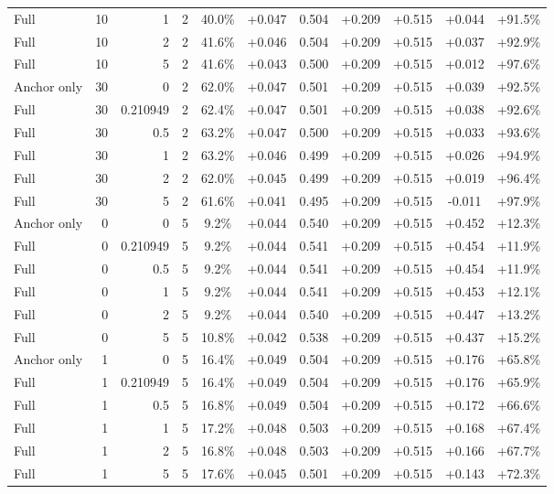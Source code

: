 \begin{table}[htbp]
\begin{tabular}{lrrrccccccc}
Full & 10 & 1 & 2 & 40.0\% & +0.047 & 0.504 & +0.209 & +0.515 & +0.044 & +91.5\% \\
Full & 10 & 2 & 2 & 41.6\% & +0.046 & 0.504 & +0.209 & +0.515 & +0.037 & +92.9\% \\
Full & 10 & 5 & 2 & 41.6\% & +0.043 & 0.500 & +0.209 & +0.515 & +0.012 & +97.6\% \\
Anchor only & 30 & 0 & 2 & 62.0\% & +0.047 & 0.501 & +0.209 & +0.515 & +0.039 & +92.5\% \\
Full & 30 & 0.210949 & 2 & 62.4\% & +0.047 & 0.501 & +0.209 & +0.515 & +0.038 & +92.6\% \\
Full & 30 & 0.5 & 2 & 63.2\% & +0.047 & 0.500 & +0.209 & +0.515 & +0.033 & +93.6\% \\
Full & 30 & 1 & 2 & 63.2\% & +0.046 & 0.499 & +0.209 & +0.515 & +0.026 & +94.9\% \\
Full & 30 & 2 & 2 & 62.0\% & +0.045 & 0.499 & +0.209 & +0.515 & +0.019 & +96.4\% \\
Full & 30 & 5 & 2 & 61.6\% & +0.041 & 0.495 & +0.209 & +0.515 & -0.011 & +97.9\% \\
Anchor only & 0 & 0 & 5 & 9.2\% & +0.044 & 0.540 & +0.209 & +0.515 & +0.452 & +12.3\% \\
Full & 0 & 0.210949 & 5 & 9.2\% & +0.044 & 0.541 & +0.209 & +0.515 & +0.454 & +11.9\% \\
Full & 0 & 0.5 & 5 & 9.2\% & +0.044 & 0.541 & +0.209 & +0.515 & +0.454 & +11.9\% \\
Full & 0 & 1 & 5 & 9.2\% & +0.044 & 0.541 & +0.209 & +0.515 & +0.453 & +12.1\% \\
Full & 0 & 2 & 5 & 9.2\% & +0.044 & 0.540 & +0.209 & +0.515 & +0.447 & +13.2\% \\
Full & 0 & 5 & 5 & 10.8\% & +0.042 & 0.538 & +0.209 & +0.515 & +0.437 & +15.2\% \\
Anchor only & 1 & 0 & 5 & 16.4\% & +0.049 & 0.504 & +0.209 & +0.515 & +0.176 & +65.8\% \\
Full & 1 & 0.210949 & 5 & 16.4\% & +0.049 & 0.504 & +0.209 & +0.515 & +0.176 & +65.9\% \\
Full & 1 & 0.5 & 5 & 16.8\% & +0.049 & 0.504 & +0.209 & +0.515 & +0.172 & +66.6\% \\
Full & 1 & 1 & 5 & 17.2\% & +0.048 & 0.503 & +0.209 & +0.515 & +0.168 & +67.4\% \\
Full & 1 & 2 & 5 & 16.8\% & +0.048 & 0.503 & +0.209 & +0.515 & +0.166 & +67.7\% \\
Full & 1 & 5 & 5 & 17.6\% & +0.045 & 0.501 & +0.209 & +0.515 & +0.143 & +72.3\% \\

\end{tabular}
\end{table}
